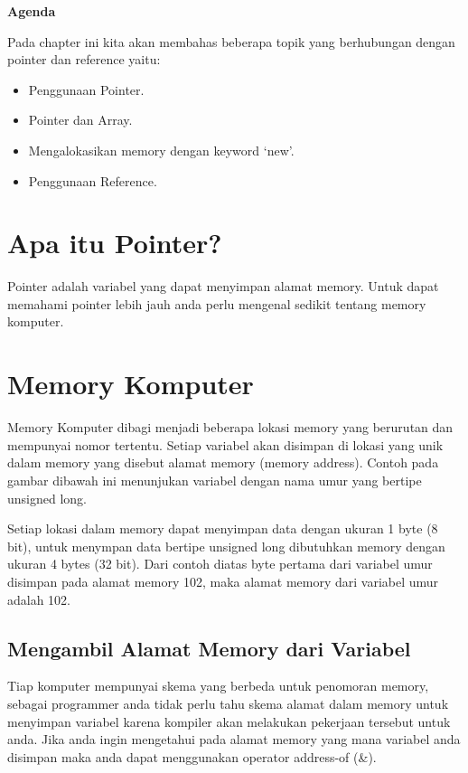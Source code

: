 

\textbf{Agenda}

Pada chapter ini kita akan membahas beberapa topik yang berhubungan
dengan pointer dan reference yaitu:

\begin{itemize}
\tightlist
\item
  Penggunaan Pointer.
\item
  Pointer dan Array.
\item
  Mengalokasikan memory dengan keyword `new'.
\item
  Penggunaan Reference.
\end{itemize}

\section{Apa itu Pointer?}\label{apa-itu-pointer}

Pointer adalah variabel yang dapat menyimpan alamat memory. Untuk dapat
memahami pointer lebih jauh anda perlu mengenal sedikit tentang memory
komputer.

\section{Memory Komputer}\label{memory-komputer}

Memory Komputer dibagi menjadi beberapa lokasi memory yang berurutan dan
mempunyai nomor tertentu. Setiap variabel akan disimpan di lokasi yang
unik dalam memory yang disebut alamat memory (memory address). Contoh
pada gambar dibawah ini menunjukan variabel dengan nama umur yang
bertipe unsigned long.

Setiap lokasi dalam memory dapat menyimpan data dengan ukuran 1 byte (8
bit), untuk menympan data bertipe unsigned long dibutuhkan memory dengan
ukuran 4 bytes (32 bit). Dari contoh diatas byte pertama dari variabel
umur disimpan pada alamat memory 102, maka alamat memory dari variabel
umur adalah 102.

\subsection{Mengambil Alamat Memory dari
Variabel}\label{mengambil-alamat-memory-dari-variabel}

Tiap komputer mempunyai skema yang berbeda untuk penomoran memory,
sebagai programmer anda tidak perlu tahu skema alamat dalam memory untuk
menyimpan variabel karena kompiler akan melakukan pekerjaan tersebut
untuk anda. Jika anda ingin mengetahui pada alamat memory yang mana
variabel anda disimpan maka anda dapat menggunakan operator address-of
(\&).

